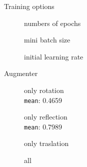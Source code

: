 \documentclass[aspectratio=169,xcolor=dvipsnames]{beamer}
\begin{document}
\begin{frame}{Training options}
\begin{figure}
	\centering
	\begin{minipage}{0.3\linewidth}
		\centering
		\footnotesize{numbers of epochs}\\\vspace{2 mm}
		\fontsize{3}{4}\vspace{1 mm}
			\fontsize{3}{4}
	\end{minipage}
	\begin{minipage}{0.3\linewidth}
	\centering
	\footnotesize{mini batch size}\\\vspace{2 mm}
	\fontsize{3}{4}\vspace{1 mm}
	\fontsize{3}{4}
\end{minipage}
	\begin{minipage}{0.3\linewidth}
	\centering
	\footnotesize{initial learning rate}\\\vspace{2 mm}
	\fontsize{3}{4}\vspace{1 mm}
	\fontsize{3}{4}
\end{minipage}
\end{figure}	
\end{frame}

\begin{frame}{Augmenter}
	\begin{figure}
		\centering
		\begin{minipage}{0.5\linewidth}
			\centering
		\tiny{only rotation\\ \texttt{mean}: 0.4659}
		\end{minipage}\hfill
		\begin{minipage}{0.5\linewidth}
			\centering
			\tiny{only reflection\\ \texttt{mean}: 0.7989}
		\end{minipage}\hfill
		\begin{minipage}{0.5\linewidth}
			\vspace{5 mm}
			\centering
			\tiny{only traslation}
				\fontsize{3}{4}
		\end{minipage}\hfill
		\begin{minipage}{0.5\linewidth}
		\centering
		\vspace{5 mm}
		\tiny{all}\\
		\fontsize{3}{4}
	\end{minipage}
	\end{figure}	
\end{frame}
\end{document}
